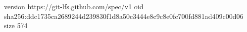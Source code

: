 version https://git-lfs.github.com/spec/v1
oid sha256:ddc1735ca2689244d239830f1d8a50c3444e8c9c8e0fc700fd881ad409c00d06
size 574
